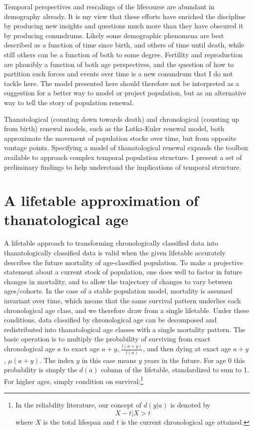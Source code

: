 \documentclass{article}
\begin{document}
Temporal perspectives and rescalings of the lifecourse are abundant in
demography already. It is my view that these efforts have enriched the
discipline by producing new insights and questions much more than they have obscured it by
producing conundrums. Likely some demographic phenomena are best
described as a function of time since birth, and others of time until death,
while still others can be a function of both to some degree. Fertility and
reproduction are plausibly a function of both age perspectives, and the question
of how to partition such forces and events over time is a new conundrum that I
do not tackle here. The model presented here should therefore not be interpreted
as a suggestion for a better way to model or project population, but as an
alternative way to tell the story of population renewal.

Thanatological (counting down towards death) and chronological (counting up
from birth) renewal models, such as the Lotka-Euler renewal model, both
approximate the movement of population stocks over time, but from opposite
vantage points. Specifying a model of thanatological renewal expands the toolbox
available to approach complex temporal population structure. I present a set of
preliminary findings to help understand the implications of temporal structure.

\section*{A lifetable approximation of thanatological age}

A lifetable approach to transforming chronologically classified data into
thanatologically classified data is valid when the given lifetable accurately
describes the future mortality of age-classified population. To make
a projective statement about a current stock of population, one does well to
factor in future changes in mortality, and to allow the trajectory of changes
to vary between ages/cohorts. In the case of a stable population model,
mortality is assumed invariant over time, which means that the same survival
pattern underlies each chronological age class, and we therefore draw from a
single lifetable. Under these conditions, data classified by chronological age
can be decomposed and redistributed into thanatological age classes with a
single mortality pattern. The basic operation is to multiply the probability of
surviving from exact chronological age $a$ to exact age $a+y$,
$\frac{l(a+y)}{l(a)}$, and then dying at exact age $a+y$, $\mu(a+y)$. The
index $y$ in this case means $y$ years in the future. For age 0 this probability
is simply the $d(a)$ column of the lifetable, standardized to sum to 1. For higher ages, simply condition on survival:\footnote{In the reliability literature, our concept of $d(y|a)$ is denoted by \begin{equation} X - t | X > t
\end{equation}
where $X$ is the total lifespan and $t$ is the current chronological age
attained.}
\end{document}
